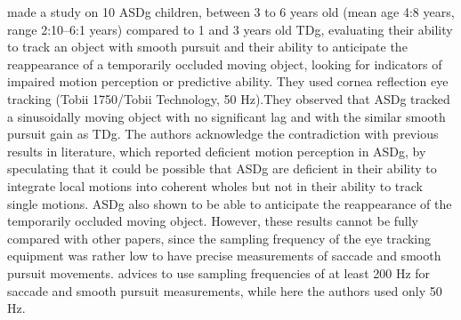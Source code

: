 \cite{vonhofsten2009lookingevents} made a study on 10 ASDg children, between 3 to 6 years old (mean age 4:8 years, range 2:10–6:1 years) compared to 1 and 3 years old TDg, evaluating their ability to track an object with smooth pursuit and their ability to anticipate the reappearance of a temporarily occluded moving object, looking for indicators of impaired motion perception or predictive ability. They used cornea reflection eye tracking (Tobii 1750/Tobii Technology, 50 Hz).They observed that ASDg tracked a sinusoidally moving object with no significant lag and with the similar smooth pursuit gain as TDg. The authors acknowledge the contradiction with previous results in literature, which reported deficient motion perception in ASDg, by speculating that it could be possible that ASDg are deficient in their ability to integrate local motions into coherent wholes but not in their ability to track single motions. ASDg also shown to be able to anticipate the reappearance of the temporarily occluded moving object. However, these results cannot be fully compared with other papers, since the sampling frequency of the eye tracking equipment was rather low to have precise measurements of saccade and smooth pursuit movements. \cite{smyrnis2008guidelines} advices to use sampling frequencies of at least 200 Hz for saccade and smooth pursuit measurements, while here the authors used only 50 Hz.

